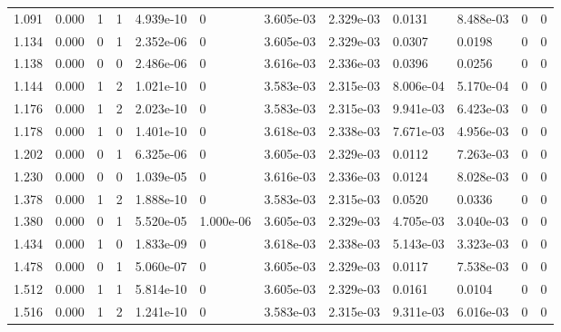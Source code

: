 \documentclass[preview]{standalone}
\begin{document}
{{\begin{tabular}{L{1.2cm}C{1.2cm} C{0.3cm}C{0.5cm} C{1.4cm}C{1.4cm} C{1.4cm}C{1.4cm} C{1.6cm}C{1.6cm} C{1.6cm}C{1.6cm}}
  1.091  &  0.000  & 1     &  1 &  4.939e-10  & 0  &  3.605e-03&   2.329e-03& 0.0131 & 8.488e-03   &  0 & 0  \\ 
  1.134  &  0.000  & 0     &  1 &  2.352e-06  & 0  &  3.605e-03&   2.329e-03& 0.0307 & 0.0198   &  0 & 0  \\ 
  1.138  &  0.000  & 0     &  0 &  2.486e-06  & 0  &  3.616e-03&   2.336e-03& 0.0396 & 0.0256   &  0 & 0  \\ 
  1.144  &  0.000  & 1     &  2 &  1.021e-10  & 0  &  3.583e-03&   2.315e-03& 8.006e-04 & 5.170e-04   &  0 & 0  \\ 
  1.176  &  0.000  & 1     &  2 &  2.023e-10  & 0  &  3.583e-03&   2.315e-03& 9.941e-03 & 6.423e-03   &  0 & 0  \\ 
  1.178  &  0.000  & 1     &  0 &  1.401e-10  & 0  &  3.618e-03&   2.338e-03& 7.671e-03 & 4.956e-03   &  0 & 0  \\ 
  1.202  &  0.000  & 0     &  1 &  6.325e-06  & 0  &  3.605e-03&   2.329e-03& 0.0112 & 7.263e-03   &  0 & 0  \\ 
  1.230  &  0.000  & 0     &  0 &  1.039e-05  & 0  &  3.616e-03&   2.336e-03& 0.0124 & 8.028e-03   &  0 & 0  \\ 
  1.378  &  0.000  & 1     &  2 &  1.888e-10  & 0  &  3.583e-03&   2.315e-03& 0.0520 & 0.0336   &  0 & 0  \\ 
  1.380  &  0.000  & 0     &  1 &  5.520e-05  & 1.000e-06  &  3.605e-03&   2.329e-03& 4.705e-03 & 3.040e-03   &  0 & 0  \\ 
  1.434  &  0.000  & 1     &  0 &  1.833e-09  & 0  &  3.618e-03&   2.338e-03& 5.143e-03 & 3.323e-03   &  0 & 0  \\ 
  1.478  &  0.000  & 0     &  1 &  5.060e-07  & 0  &  3.605e-03&   2.329e-03& 0.0117 & 7.538e-03   &  0 & 0  \\ 
  1.512  &  0.000  & 1     &  1 &  5.814e-10  & 0  &  3.605e-03&   2.329e-03& 0.0161 & 0.0104   &  0 & 0  \\ 
  1.516  &  0.000  & 1     &  2 &  1.241e-10  & 0  &  3.583e-03&   2.315e-03& 9.311e-03 & 6.016e-03   &  0 & 0  \\ 
\hline 
\end{tabular} 

}}
\end{document}

